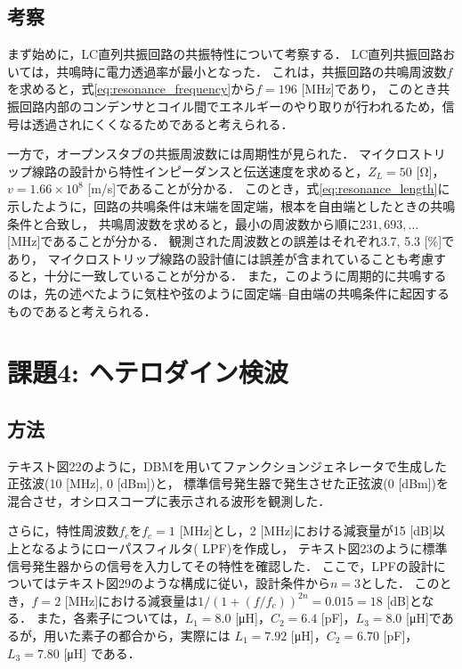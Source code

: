 \documentclass[uplatex,dvipdfmx,a4j,12pt]{jsarticle}
\begin{document}
\subsection{考察}
まず始めに，LC直列共振回路の共振特性について考察する．
LC直列共振回路おいては，共鳴時に電力透過率が最小となった．
これは，共振回路の共鳴周波数$f$を求めると，式\eqref{eq:resonance_frequency}から$f = 196$ [MHz]であり，
このとき共振回路内部のコンデンサとコイル間でエネルギーのやり取りが行われるため，信号は透過されにくくなるためであると考えられる．

一方で，オープンスタブの共振周波数には周期性が見られた．
マイクロストリップ線路の設計から特性インピーダンスと伝送速度を求めると，$Z_L = 50$ [\si{\ohm}]，$v = 1.66\times 10^8$ [m/s]であることが分かる．
このとき，式\eqref{eq:resonance_length}に示したように，回路の共鳴条件は末端を固定端，根本を自由端としたときの共鳴条件と合致し，
共鳴周波数を求めると，最小の周波数から順に$231, 693, \dots$ [MHz]であることが分かる．
観測された周波数との誤差はそれぞれ3.7, 5.3 [\%]であり，
マイクロストリップ線路の設計値には誤差が含まれていることも考慮すると，十分に一致していることが分かる．
また，このように周期的に共鳴するのは，先の述べたように気柱や弦のように固定端--自由端の共鳴条件に起因するものであると考えられる．


\section{課題4: ヘテロダイン検波}
\subsection{方法}
テキスト図22のように，DBMを用いてファンクションジェネレータで生成した正弦波(10 [MHz], 0 [dBm])と，
標準信号発生器で発生させた正弦波(0 [dBm])を混合させ，オシロスコープに表示される波形を観測した．

さらに，特性周波数$f_c$を$f_c = 1$ [MHz]とし，2 [MHz]における減衰量が15 [dB]以上となるようにローパスフィルタ( LPF)を作成し，
テキスト図23のように標準信号発生器からの信号を入力してその特性を確認した．
ここで，LPFの設計についてはテキスト図29のような構成に従い，設計条件から$n = 3$とした．
このとき，$f = 2$ [MHz]における減衰量は$1/(1 + (f/f_c))^{2n} = 0.015 = 18$ [dB]となる．
また，各素子については，$L_1  = 8.0$ [\si{\micro \henry}]，$C_2 = 6.4$ [\si{\pico \farad}]，$L_3 = 8.0$ [\si{\micro \henry}]であるが，用いた素子の都合から，実際には
$L_1  = 7.92$ [\si{\micro \henry}]，$C_2 = 6.70$ [\si{\pico \farad}]，$L_3 = 7.80$ [\si{\micro \henry}]
である．
\end{document}
